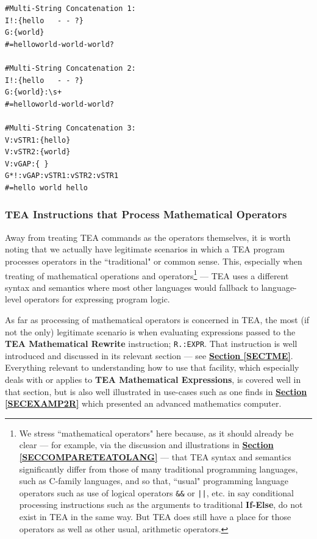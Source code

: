 \documentclass[a4paper, 18pt]{book} %
\begin{document}
{{{\begin{appendices}
\vspace{2em}

  \begin{tcolorbox}[teaterminalstyle, title=TEA OPERATIONS: Example 2: Multi-Argument Operators: String Concatenation, breakable]
  \begin{lstlisting}[language=TEA,breaklines=true,]
#Multi-String Concatenation 1:
I!:{hello   - - ?}
G:{world}
#=helloworld-world-world?

#Multi-String Concatenation 2:
I!:{hello   - - ?}
G:{world}:\s+
#=helloworld-world-world?

#Multi-String Concatenation 3:
V:vSTR1:{hello}
V:vSTR2:{world}
V:vGAP:{ }
G*!:vGAP:vSTR1:vSTR2:vSTR1
#=hello world hello
   \end{lstlisting}
  \end{tcolorbox}

\vspace{2em}


\subsubsection{TEA Instructions that Process Mathematical Operators}


Away from treating TEA commands as the operators themselves, it is worth noting that we actually have legitimate scenarios in which a TEA program processes operators in the ``traditional" or common sense. This, especially when treating of mathematical operations and operators\footnote{We stress ``mathematical operators" here because, as it should already be clear --- for example, via the discussion and illustrations in \textbf{\hyperref[SECCOMPARETEATOLANG]{Section \ref{SECCOMPARETEATOLANG}}} --- that TEA syntax and semantics significantly differ from those of many traditional programming languages, such as C-family languages, and so that, ``usual" programming language operators such as use of logical operators \texttt{\&\&} or \texttt{||}, etc. in say conditional processing instructions such as  the arguments to traditional \textbf{If-Else}, do not exist in TEA in the same way. But TEA does still have a place for those operators as well as other usual, arithmetic operators.} --- TEA uses a different syntax and semantics where most other languages would fallback to language-level operators for expressing program logic.

\vspace{2em}

As far as processing of mathematical operators is concerned in TEA, the most (if not the only) legitimate scenario is when evaluating expressions passed to the \textbf{TEA Mathematical Rewrite} instruction; \texttt{R.:EXPR}. That instruction is well introduced and discussed in its relevant section --- see \textbf{\hyperref[SECTME]{Section \ref{SECTME}}}. Everything relevant to understanding how to use that facility, which especially deals with or applies to \textbf{TEA Mathematical Expressions}, is covered well in that section, but is also well illustrated in use-cases such as one finds in \textbf{\hyperref[SECEXAMP2R]{Section \ref{SECEXAMP2R}}} which presented an advanced mathematics computer.


\end{appendices}}}}
\end{document}
